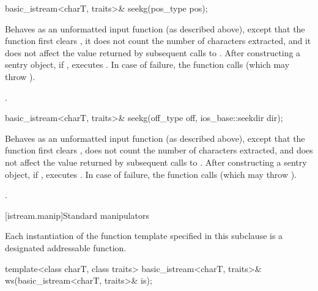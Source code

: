 %
\begin{itemdecl}
basic_istream<charT, traits>& seekg(pos_type pos);
\end{itemdecl}

\begin{itemdescr}
\pnum
\effects
Behaves as an unformatted input function (as described above), except that
the function first clears ,
it does not count
the number of characters extracted, and it does not affect the value
returned by subsequent calls to
.
After constructing a sentry object, if
,
executes
.
In case of failure, the function calls
(which may throw
).

\pnum
\returns
{}.
\end{itemdescr}

%
\begin{itemdecl}
basic_istream<charT, traits>& seekg(off_type off, ios_base::seekdir dir);
\end{itemdecl}

\begin{itemdescr}
\pnum
\effects
Behaves as an unformatted input function (as described above), except that the function first clears ,
does not count the number of characters extracted, and
does not affect the value returned by subsequent calls to .
After constructing a sentry object, if
,
executes
.
In case of failure, the function calls  (which may throw
).

\pnum
\returns
{}.
\end{itemdescr}

[istream.manip]{Standard  manipulators}

\pnum
Each instantiation of the function template
specified in this subclause
is a designated addressable function.

%
\begin{itemdecl}
template<class charT, class traits>
  basic_istream<charT, traits>& ws(basic_istream<charT, traits>& is);
\end{itemdecl}

